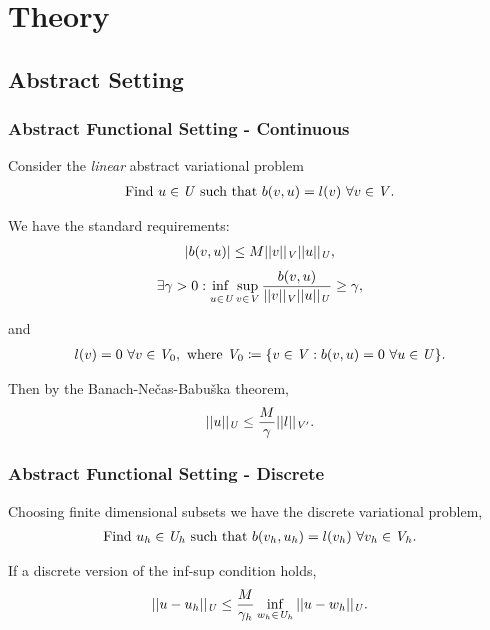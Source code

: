 \section{Theory}

\subsection{Abstract Setting}

\begin{frame}
\frametitle{Abstract Functional Setting - Continuous}

Consider the \emph{linear} abstract variational problem
\begin{align} \label{eq:bilinear_abstract_infinite}
\text{Find}\ u \in \mathit{{{U}}}\ \text{such that}\
b(v,u) = l(v)\ \forall v \in \mathit{{{V}}}.
\end{align}

We have the standard requirements:
\begin{align}
| b(v,u) | \le M
||v||_{\mathit{{{V}}}}
||u||_{\mathit{{{U}}}},
\end{align}
\begin{align} \label{eq:inf_sup_infinite}
\exists \gamma > 0 :
\adjustlimits\inf_{u\in\fspace{U}} \sup_{v\in\fspace{V}}
\frac{b(v,u)}{||v||_{\fspace{V}}||u||_{\fspace{U}}} \ge \gamma,
\end{align}

and
\begin{align}
l(v) = 0\ \forall v \in \mathit{{{V}}}_0,\ \text{where}\ \mathit{{{V}}}_0 \coloneqq \{v \in \mathit{{{V}}} : b(v,u) = 0\ \forall u
\in \mathit{{{U}}} \}.
\end{align}

Then by the Banach-Ne\v{c}as-Babu\v{s}ka theorem,
\begin{align}
||u||_{\mathit{{{U}}}} \le \frac{M}{\gamma} ||l||_{\mathit{{{V}}}'}.
\end{align}

\end{frame}

\begin{frame}
\frametitle{Abstract Functional Setting - Discrete}

Choosing finite dimensional subsets we have the discrete variational problem,
\begin{align} \label{eq:bilinear_abstract_finite}
\text{Find}\ u_h \in \mathit{{{U}}}_h\ \text{such that}\
b(v_h,u_h) = l(v_h)\ \forall v_h \in \mathit{{{V}}}_h.
\end{align}

If a discrete version of the inf-sup condition holds,
\begin{align} \label{eq:abstract_dpg_error}
||u-u_h||_{\mathit{{{U}}}} \le \frac{M}{\gamma_h} \inf_{w_h \in \mathit{{{U}}}_h} ||u-w_h||_{\mathit{{{U}}}}.
\end{align}

\end{frame}

